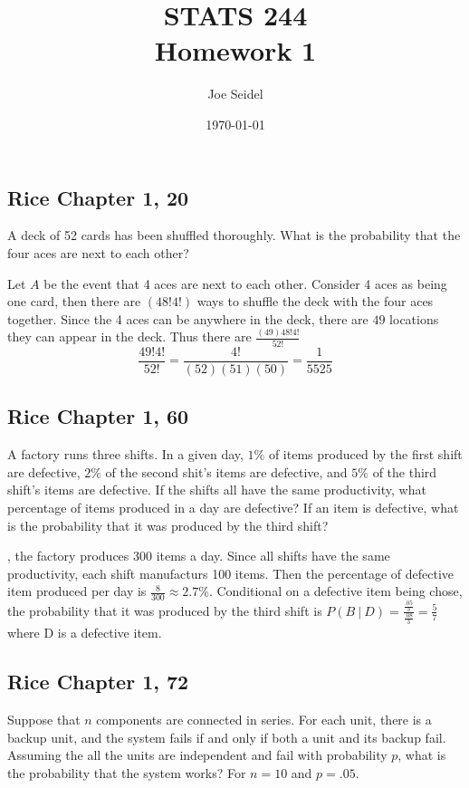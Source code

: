 \documentclass{tufte-book}
\title{STATS 244 \\ Homework 1}
\author{Joe Seidel}
\date{\today}
\theoremstyle{mytheoremstyle}
\theoremstyle{mylemstyle}
\theoremstyle{mydefstyle}
\begin{document}
\maketitle
{}
\newpage
{}


\subsection{Rice Chapter 1, 20}
A deck of 52 cards has been shuffled thoroughly. What is the probability that the four aces are next to each other?

Let $A$ be the event that 4 aces are next to each other.  Consider 4 aces as being one card, then there are $(48!4!)$ ways to shuffle the deck with the four aces together.   Since the 4 aces can be anywhere in the deck, there are $49$ locations they can appear in the deck.  Thus there are $\frac{(49)48!4!}{52!}$
\[ \frac{49!4!}{52!} = \frac{4!}{(52)(51)(50)} = \frac{1}{5525} \]


\subsection{Rice Chapter 1, 60}
A factory runs three shifts.  In a given day, $1\%$ of items produced by the first shift are defective, $2\%$ of the second shit's items are defective, and $5\%$ of the third shift's items are defective.  If the shifts all have the same productivity, what percentage of items produced in a day are defective?  If an item is defective, what is the probability that it was produced by the third shift?

, the factory produces 300 items a day.  Since all shifts have the same productivity, each shift manufacturs 100 items.   Then the percentage of defective item produced per day is $\frac{8}{300} \approx 2.7\%$.  Conditional on a defective item being chose, the probability that it was produced by the third shift is $P(B \ | \  D)=\frac{\frac{.05}{3}}{\frac{.08}{3}} = \frac{5}{7}$ where D is a defective item.


\subsection{Rice Chapter 1, 72}
Suppose that $n$ components are connected in series.  For each unit, there is a backup unit, and the system fails if and only if both a unit and its backup fail.  Assuming the all the units are independent and fail with probability $p$, what is the probability that the system works?  For $n=10$ and $p=.05$.
\end{document}
